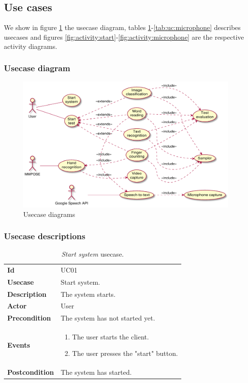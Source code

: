 \clearpage
\subsection{Use cases}
We show in figure \ref{fig:usecase:diagram} the usecase diagram, tables \ref{tab:uc:system}-\ref{tab:uc:microphone} describes usecases and figures \ref{fig:activity:start}-\ref{fig:activity:microphone} are the respective activity diagrams.

\subsubsection{Usecase diagram}
\begin{figure}[h!t]
    \centering
    \includegraphics[scale=0.55]{assets/plantuml/pdf/diagram.pdf}
    \caption{Usecase diagrams}
    \label{fig:usecase:diagram}
\end{figure}

\clearpage
\subsubsection{Usecase descriptions}
\begin{table}[h!t]
    \centering
    \caption{\emph{Start system} usecase.}
    \label{tab:uc:system}
    \centering
    \begin{tabular}{l | p{80mm}}
        \textbf{Id}            & UC01                            \\
        \textbf{Usecase}       & Start system.                   \\
        \textbf{Description}   & The system starts.              \\
        \textbf{Actor}         & User                            \\
        \textbf{Precondition}  & The system has not started yet. \\
        \textbf{Events}        & \begin{enumerate}
            \item The user starts the client.
            \item The user presses the "start" button.
        \end{enumerate}      \\
        \textbf{Postcondition} & The system has started.
    \end{tabular}
\end{table}

